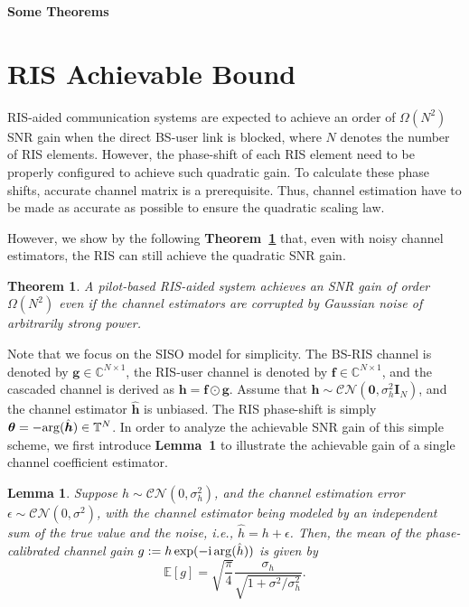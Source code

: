 \documentclass[a4paper,12pt]{article}
\newtheorem{theorem}{\bf Theorem}
\newtheorem{lemma}{\bf Lemma}
\def \ri {{\rm i}}
\begin{document}
    
\begin{center}
    {\Large\bf Some Theorems}
\end{center}

\section{RIS Achievable Bound}
RIS-aided communication systems are expected to achieve an order of $\Omega(N^2)$ SNR gain when the direct BS-user link is blocked, where $N$ denotes the number of RIS elements. However, the phase-shift of each RIS element need to be properly configured to achieve such quadratic gain. To calculate these phase shifts, accurate channel matrix is a prerequisite. Thus, channel estimation have to be made as accurate as possible to ensure the quadratic scaling law. 

However, we show by the following {\bf Theorem~\ref{thm1}} that, even with noisy channel estimators, the RIS can still achieve the quadratic SNR gain. 
\begin{theorem} \label{thm1}
    A pilot-based RIS-aided system achieves an SNR gain of order $\Omega(N^2)$ even if the channel estimators are corrupted by Gaussian noise of arbitrarily strong power. 
\end{theorem}

Note that we focus on the SISO model for simplicity. The BS-RIS channel is denoted by ${\bm g}\in\mathbb{C}^{N\times 1}$, the RIS-user channel is denoted by ${\bm f}\in\mathbb{C}^{N\times 1}$, and the cascaded channel is derived as ${\bm h} = {\bm f}\odot {\bm g}$. Assume that ${\bm h}\sim {\mathcal{CN}}({\bm 0},\sigma_h^2 {\bm I}_N)$, and the channel estimator $\hat{\bm h}$ is unbiased. The RIS phase-shift is simply ${\bm \theta} = -{\rm arg}(\hat{\bm h})\in {\mathbb{T}}^N$. In order to analyze the achievable SNR gain of this simple scheme, we first introduce {\bf Lemma~1} to illustrate the achievable gain of a single channel coefficient estimator. 

\begin{lemma}
    Suppose $h\sim \mathcal{CN}(0,\sigma_h^2)$, and the channel estimation error $\epsilon\sim \mathcal{CN}(0,\sigma^2)$, with the channel estimator being modeled by an independent sum of the true value and the noise, i.e., $\hat{h} = h+\epsilon$. 
    Then, the mean of the phase-calibrated channel gain $g:=h\exp(-\ri\,{\rm arg}(\hat{h}) )$ is given by  
    \begin{equation}
        \mathbb{E}\left[ g \right] = \sqrt{\frac{\pi}{4}}\frac{\sigma_h}{\sqrt{1+\sigma^2/\sigma_h^2}}.
    \end{equation}
\end{lemma}
\end{document}
